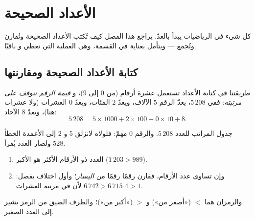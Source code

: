 \chapter{الأعداد الصحيحة}\label{ch:g6:wholes}

كل شيء في الرياضيات يبدأ بالعدّ. يراجع هذا الفصل كيف تُكتب
الأعداد الصحيحة وتُقارن وتُجمع --- ويتأمل بعناية في
القسمة، وهي العملية التي تعطي  \emph{و}
باقيًا.

\section{كتابة الأعداد الصحيحة ومقارنتها}

\begin{definition}\label{def:g6:wholes:place}
طريقتنا في كتابة الأعداد تستعمل عشرة أرقام (من $0$ إلى $9$)، و
\emph{قيمة الرقم تتوقف على مرتبته}: ففي
$5\,208$، يعدّ الرقم $5$ الآلاف، ويعدّ $2$ المئات، ويعدّ
$0$ العشرات (ولا عشرات هنا)، ويعدّ $8$ الآحاد:
\[
5\,208 = 5 \times 1000 + 2 \times 100 + 0 \times 10 + 8 .
\]
\end{definition}

\begin{omfigure}

{\small جدول المراتب للعدد $5\,208$. والرقم $0$ مهمّ: فلولاه
لانزلق $5$ و $2$ إلى الأعمدة الخطأ ولصار العدد
يُقرأ $528$.}
\end{omfigure}

\begin{method}\label{met:g6:wholes:compare}
\begin{enumerate}
  \item العدد ذو الأرقام الأكثر هو الأكبر
        ($1\,203 > 989$).
  \item وإن تساوى عدد الأرقام، فقارن رقمًا رقمًا
        من \emph{اليسار}؛ وأول اختلاف يفصل:
        $6\,742 > 6\,715$ لأن في مرتبة العشرات $4 > 1$.
\end{enumerate}
والرمزان هما $<$ («أصغر من») و $>$ («أكبر من»)؛ والطرف
الضيق من الرمز يشير إلى العدد الصغير.
\end{method}

